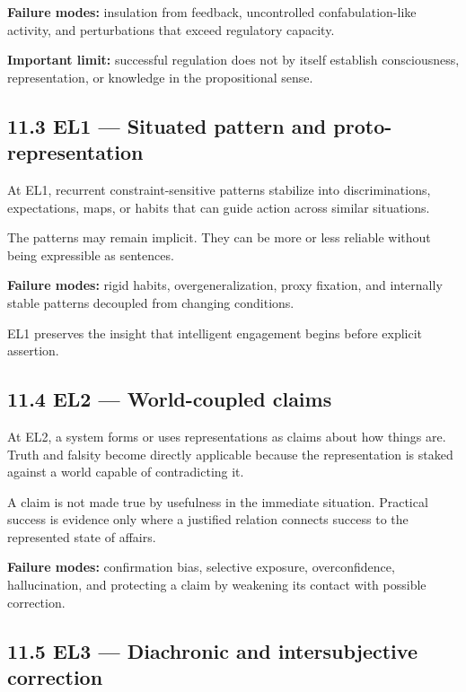 \documentclass[
  11pt,
]{article}
\begin{document}
\textbf{Failure modes:} insulation from feedback, uncontrolled
confabulation-like activity, and perturbations that exceed regulatory
capacity.

\textbf{Important limit:} successful regulation does not by itself
establish consciousness, representation, or knowledge in the
propositional sense.

\subsection{11.3 EL1 --- Situated pattern and
proto-representation}\label{el1-situated-pattern-and-proto-representation}

At EL1, recurrent constraint-sensitive patterns stabilize into
discriminations, expectations, maps, or habits that can guide action
across similar situations.

The patterns may remain implicit. They can be more or less reliable
without being expressible as sentences.

\textbf{Failure modes:} rigid habits, overgeneralization, proxy
fixation, and internally stable patterns decoupled from changing
conditions.

EL1 preserves the insight that intelligent engagement begins before
explicit assertion.

\subsection{11.4 EL2 --- World-coupled
claims}\label{el2-world-coupled-claims}

At EL2, a system forms or uses representations as claims about how
things are. Truth and falsity become directly applicable because the
representation is staked against a world capable of contradicting it.

A claim is not made true by usefulness in the immediate situation.
Practical success is evidence only where a justified relation connects
success to the represented state of affairs.

\textbf{Failure modes:} confirmation bias, selective exposure,
overconfidence, hallucination, and protecting a claim by weakening its
contact with possible correction.

\subsection{11.5 EL3 --- Diachronic and intersubjective
correction}\label{el3-diachronic-and-intersubjective-correction}
\end{document}
